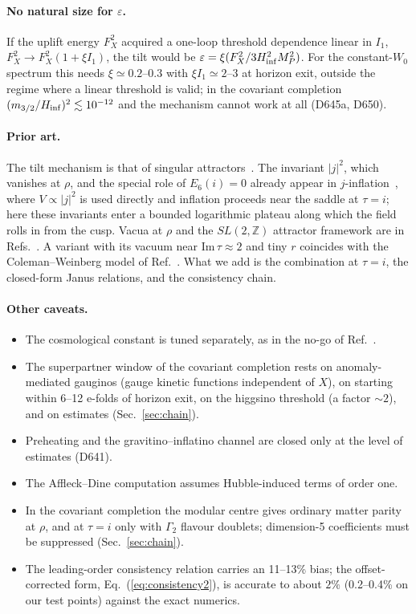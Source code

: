 \documentclass[aps,prd,twocolumn,superscriptaddress,nofootinbib,floatfix]{revtex4-2}
\begin{document}
\paragraph{No natural size for $\varepsilon$.} If the uplift energy $F_X^2$ acquired a one-loop threshold dependence linear in $I_1$, $F_X^2\to F_X^2(1+\xi I_1)$, the tilt would be $\varepsilon=\xi(F_X^2/3H_{\rm inf}^2M_P^2)$. For the constant-$W_0$ spectrum this needs $\xi\simeq0.2$--$0.3$ with $\xi I_1\simeq2$--$3$ at horizon exit, outside the regime where a linear threshold is valid; in the covariant completion $(m_{3/2}/H_{\rm inf})^2\lesssim10^{-12}$ and the mechanism cannot work at all (D645a, D650).

\paragraph{Prior art.} The tilt mechanism is that of singular attractors~\cite{arXiv_2512_02969}. The invariant $|j|^2$, which vanishes at $\rho$, and the special role of $E_6(i)=0$ already appear in $j$-inflation~\cite{arXiv_1612_09559}, where $V\propto|j|^2$ is used directly and inflation proceeds near the saddle at $\tau=i$; here these invariants enter a bounded logarithmic plateau along which the field rolls in from the cusp. Vacua at $\rho$ and the $SL(2,\mathbb{Z})$ attractor framework are in Refs.~\cite{arXiv_2408_05203,arXiv_2412_19324}. A variant with its vacuum near $\mathrm{Im}\,\tau \approx 2$ and tiny $r$ coincides with the Coleman--Weinberg model of Ref.~\cite{arXiv_2607_00528}. What we add is the combination at $\tau = i$, the closed-form Janus relations, and the consistency chain.

\paragraph{Other caveats.}
\begin{itemize}
\item The cosmological constant is tuned separately, as in the no-go of Ref.~\cite{arXiv_2212_03876}.
\item The superpartner window of the covariant completion rests on anomaly-mediated gauginos (gauge kinetic functions independent of $X$), on starting within 6--12 e-folds of horizon exit, on the higgsino threshold (a factor $\sim2$), and on estimates (Sec.~\ref{sec:chain}).
\item Preheating and the gravitino--inflatino channel are closed only at the level of estimates (D641).
\item The Affleck--Dine computation assumes Hubble-induced terms of order one.
\item In the covariant completion the modular centre gives ordinary matter parity at $\rho$, and at $\tau=i$ only with $\Gamma_2$ flavour doublets; dimension-5 coefficients must be suppressed (Sec.~\ref{sec:chain}).
\item The leading-order consistency relation carries an 11--13\% bias; the offset-corrected form, Eq.~(\ref{eq:consistency2}), is accurate to about $2\%$ (0.2--0.4\% on our test points) against the exact numerics.
\end{itemize}
\end{document}

